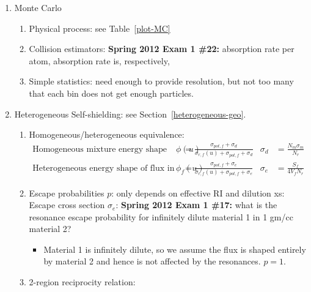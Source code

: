 \documentclass{school-22.211-notes}
\begin{document}
\begin{enumerate}
\item Monte Carlo
  \begin{enumerate}
    \item Physical process:  see Table~\ref{plot-MC}
    \item Collision estimators: \textbf{Spring 2012 Exam 1 \#22:}   absorption  rate per atom, absorption rate is, respectively, 
    \item Simple statistics:  need enough to provide resolution, but not too many that each bin does not get enough particles.
  \end{enumerate}
  
\item Heterogeneous Self-shielding: see Section~\ref{heterogeneous-geo}.
  \begin{enumerate}
    \item Homogeneous/heterogeneous equivalence: 
      \begin{align*}
        \mbox{Homogeneous mixture energy shape of flux } \phi(u) &= \frac{\sigma_{pot, f} + \sigma_d}{\sigma_{r,f} (u) + \sigma_{pot, f} + \sigma_d}   & \sigma_d &= \frac{N_m \sigma_m}{N_r}  \\
        \mbox{Heterogeneous energy shape of flux in the fuel } \phi_f(u) &= \frac{\sigma_{pot, f} + \sigma_e}{\sigma_{r,f} (u) + \sigma_{pot, f} + \sigma_e}   & \sigma_e &= \frac{S_f}{4 V_f N_r} 
      \end{align*}

    \item Escape probabilities $p$: only depends on effective RI and dilution xs: 
      Escape cross section $\sigma_e$: 
      \textbf{Spring 2012 Exam 1 \#17:} what is the resonance escape probability for infinitely dilute material 1 in 1 gm/cc material 2? 
      \begin{itemize}
        \item Material 1 is infinitely dilute, so we assume the flux is shaped entirely by material 2 and hence is not affected by the resonances. $p = 1$. 
      \end{itemize}

    \item 2-region reciprocity relation:


\end{enumerate}
\end{enumerate}
\end{document}
